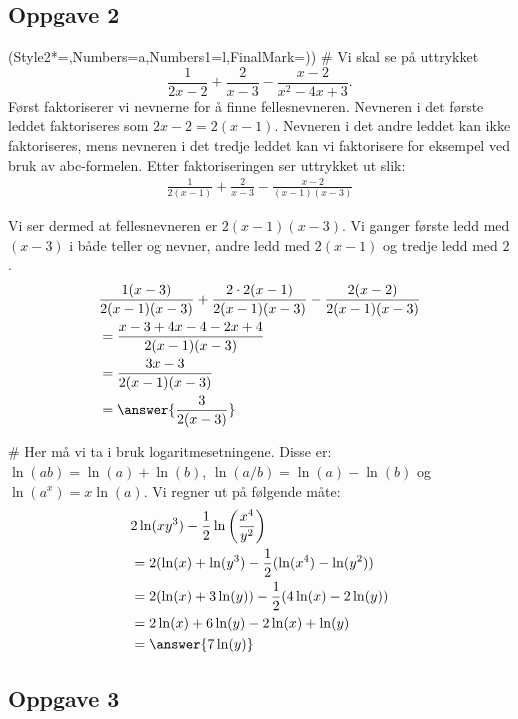 \subsection*{Oppgave 2}
\begin{easylist}[enumerate]
	\ListProperties(Style2*=,Numbers=a,Numbers1=l,FinalMark={)})
	# Vi skal se på uttrykket
	\begin{equation*}
		\frac{1}{2x-2} + \frac{2}{x-3} - \frac{x-2}{x^2 - 4x +3}.
	\end{equation*}
	Først faktoriserer vi nevnerne for å finne fellesnevneren. 
	Nevneren i det første leddet faktoriseres som $2x-2 = 2(x-1)$. 
	Nevneren i det andre leddet kan ikke faktoriseres, mens nevneren i det tredje leddet kan vi faktorisere for eksempel ved bruk av abc-formelen.
	 Etter faktoriseringen ser uttrykket ut slik:
	\begin{align*}
			\frac{1}{2(x-1)} + \frac{2}{x-3} - \frac{x-2}{(x-1)(x-3)}
	\end{align*}
	
	Vi ser dermed at fellesnevneren er $2(x-1)(x-3)$. Vi ganger første ledd med $(x-3)$ i både teller og nevner, andre ledd med $2(x-1)$ og tredje ledd med $2$.
	\begin{align*}
		&\frac{1(x-3)}{2(x-1)(x-3)} + \frac{2 \cdot 2(x-1)}{2(x-1)(x-3)} - \frac{2(x-2)}{2(x-1)(x-3)} \\
		& = \frac{x - 3 +4x - 4 - 2x + 4}{2(x-1)(x-3)} \\
		& = \frac{3x-3}{2(x-1)(x-3)}\\
		& = \answer{\frac{3}{2(x-3)}}
	\end{align*}
	
	# Her må vi ta i bruk logaritmesetningene. Disse er: 
	$\ln(ab) = \ln(a) + \ln(b)$, 
	$\ln\left(a / b\right) = \ln(a) - \ln(b)$ og 
	$\ln(a^x) = x \ln(a)$.
	Vi regner ut på følgende måte:
	\begin{align*}
		&2\ln(x y^3) - \frac{1}{2} \ln \left (\frac{x^4}{y^2} \right) \\
		& = 2(\ln(x) + \ln(y^3) - \frac{1}{2}(\ln(x^4) - \ln(y^2)) \\
		& = 2(\ln(x) + 3\ln(y)) - \frac{1}{2}(4\ln(x) - 2\ln(y))\\
		& = 2\ln(x) + 6\ln(y) - 2\ln(x) + \ln(y)\\
		& = \answer{7\ln(y)}
	\end{align*}
	
\end{easylist}

\subsection*{Oppgave 3}

